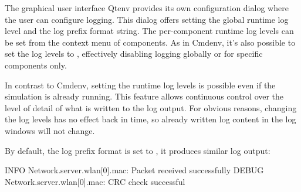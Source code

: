 The graphical user interface Qtenv provides its own configuration
dialog where the user can configure logging. This dialog offers setting the
global runtime log level and the log prefix format string. The per-component
runtime log levels can be set from the context menu of components. As in Cmdenv,
it's also possible to set the log levels to , effectively disabling
logging globally or for specific components only.

In contrast to Cmdenv, setting the runtime log levels is possible even if the
simulation is already running. This feature allows continuous control over the
level of detail of what is written to the log output. For obvious reasons,
changing the log levels has no effect back in time, so already written log
content in the log windows will not change.

By default, the log prefix format is set to , it produces
similar log output:

\begin{filelisting}
INFO  Network.server.wlan[0].mac: Packet received successfully
DEBUG Network.server.wlan[0].mac: CRC check successful
\end{filelisting}



